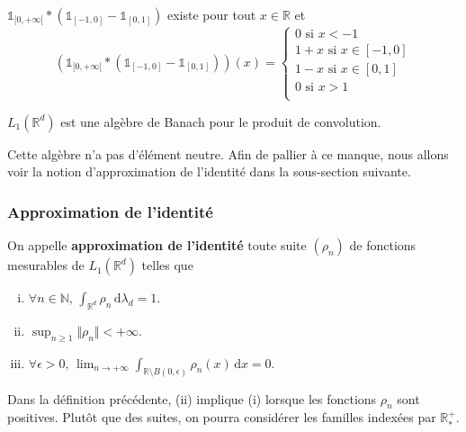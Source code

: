 	\begin{example}
		$\mathbb{1}_{[0,+\infty[} * (\mathbb{1}_{[-1,0]} - \mathbb{1}_{[0,1]})$ existe pour tout $x \in \mathbb{R}$ et
		\[ (\mathbb{1}_{[0,+\infty[} * (\mathbb{1}_{[-1,0]} - \mathbb{1}_{[0,1]}))(x) =
		\begin{cases}
			0 \text{ si } x < -1 \\
			1+x \text{ si } x \in [-1,0] \\
			1-x \text{ si } x \in [0,1] \\
			0 \text{ si } x > 1 \\
		\end{cases}
		\]
	\end{example}


	\begin{proposition}
		$L_1(\mathbb{R}^d)$ est une algèbre de Banach pour le produit de convolution.
	\end{proposition}

	\begin{remark}
		Cette algèbre n'a pas d'élément neutre. Afin de pallier à ce manque, nous allons voir la notion d'approximation de l'identité dans la sous-section suivante.
	\end{remark}

	\subsubsection{Approximation de l'identité}


	\begin{definition}
		On appelle \textbf{approximation de l'identité} toute suite $(\rho_n)$ de fonctions mesurables de $L_1(\mathbb{R}^d)$ telles que
		\begin{enumerate}[(i)]
			\item $\forall n \in \mathbb{N}, \, \int_{\mathbb{R}^d} \rho_n \, \mathrm{d}\lambda_d = 1$.
			\item $\sup_{n \geq 1} \Vert \rho_n \Vert < +\infty$.
			\item $\forall \epsilon > 0, \, \lim_{n \rightarrow +\infty} \int_{\mathbb{R} \setminus B(0, \epsilon)} \rho_n(x) \, \mathrm{d}x = 0$.
		\end{enumerate}
	\end{definition}

	\begin{remark}
		Dans la définition précédente, (ii) implique (i) lorsque les fonctions $\rho_n$ sont positives. Plutôt que des suites, on pourra considérer les familles indexées par $\mathbb{R}_*^+$.
	\end{remark}

